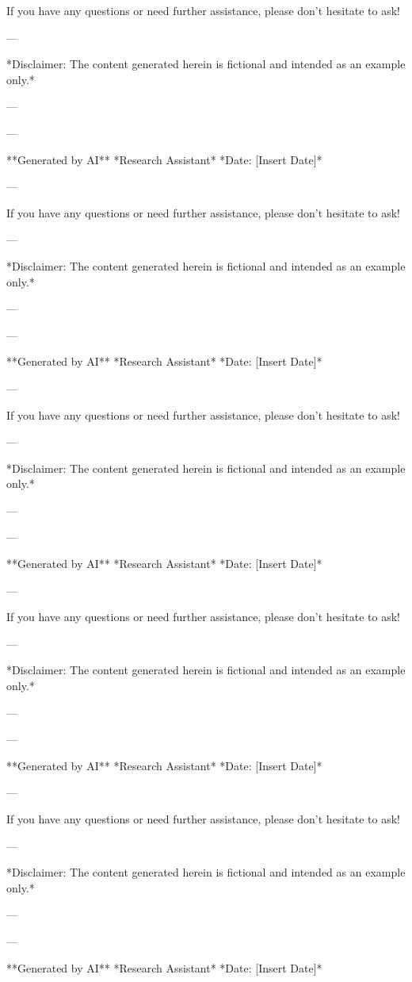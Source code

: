 If you have any questions or need further assistance, please don't hesitate to ask! 

--- 

*Disclaimer: The content generated herein is fictional and intended as an example only.* 

--- 

--- 

**Generated by AI** 
*Research Assistant* 
*Date: [Insert Date]*

--- 

If you have any questions or need further assistance, please don't hesitate to ask! 

--- 

*Disclaimer: The content generated herein is fictional and intended as an example only.* 

--- 

--- 

**Generated by AI** 
*Research Assistant* 
*Date: [Insert Date]*

--- 

If you have any questions or need further assistance, please don't hesitate to ask! 

--- 

*Disclaimer: The content generated herein is fictional and intended as an example only.* 

--- 

--- 

**Generated by AI** 
*Research Assistant* 
*Date: [Insert Date]*

--- 

If you have any questions or need further assistance, please don't hesitate to ask! 

--- 

*Disclaimer: The content generated herein is fictional and intended as an example only.* 

--- 

--- 

**Generated by AI** 
*Research Assistant* 
*Date: [Insert Date]*

--- 

If you have any questions or need further assistance, please don't hesitate to ask! 

--- 

*Disclaimer: The content generated herein is fictional and intended as an example only.* 

--- 

--- 

**Generated by AI** 
*Research Assistant* 
*Date: [Insert Date]*

